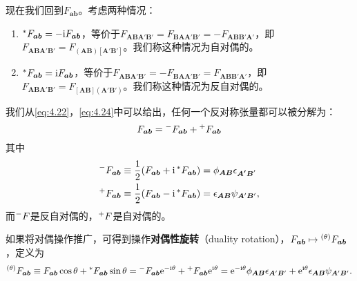 现在我们回到$F_{\boldsymbol{ab}}$。考虑两种情况：
\begin{enumerate}[label=(\alph*)]
	\item $\prescript{*}{}{} F_{\boldsymbol{ab}} =-\mathrm{i} F_{\boldsymbol{ab}}$，等价于$F_{\boldsymbol{ABA} '\boldsymbol{B} '} =F_{\boldsymbol{BAA} '\boldsymbol{B} '} =-F_{\boldsymbol{ABB} '\boldsymbol{A} '}$，即$F_{\boldsymbol{ABA} '\boldsymbol{B} '} =F_{(\boldsymbol{AB})[\boldsymbol{A} '\boldsymbol{B} ']}$。我们称这种情况为自对偶的。
	\item $\prescript{*}{}{} F_{\boldsymbol{ab}} =\mathrm{i} F_{\boldsymbol{ab}}$，等价于$F_{\boldsymbol{ABA} '\boldsymbol{B} '} =-F_{\boldsymbol{BAA} '\boldsymbol{B} '} =F_{\boldsymbol{ABB} '\boldsymbol{A} '}$，即$F_{\boldsymbol{ABA} '\boldsymbol{B} '} =F_{[\boldsymbol{AB}](\boldsymbol{A} '\boldsymbol{B} ')}$。我们称这种情况为反自对偶的。
\end{enumerate}

我们从\ref{eq:4.22}，\ref{eq:4.24}中可以给出，任何一个反对称张量都可以被分解为：
\begin{equation*}
	F_{\boldsymbol{ab}} =\prescript{-}{}{} F_{\boldsymbol{ab}} +\prescript{+}{}{} F_{\boldsymbol{ab}}
\end{equation*}
其中
\begin{equation*}
	\begin{aligned}
		\prescript{-}{}{} F_{\boldsymbol{ab}} & \equiv \frac{1}{2} (F_{\boldsymbol{ab}} +\mathrm{i}\prescript{*}{}{} F_{\boldsymbol{ab}} )=\phi _{\boldsymbol{AB}} \epsilon _{\boldsymbol{A'B} '}\\
		\prescript{+}{}{} F_{\boldsymbol{ab}} & \equiv \frac{1}{2} (F_{\boldsymbol{ab}} -\mathrm{i}\prescript{*}{}{} F_{\boldsymbol{ab}} )=\epsilon _{\boldsymbol{AB}} \psi _{\boldsymbol{A} '\boldsymbol{B} '} ,
	\end{aligned}
\end{equation*}
而$\prescript{-}{}{} F$是反自对偶的，$\prescript{+}{}{} F$是自对偶的。



如果将对偶操作推广，可得到操作\textbf{对偶性旋转}（duality rotation），$F_{\boldsymbol{ab}} \mapsto \prescript{( \theta )}{}{} F_{\boldsymbol{ab}}$，定义为
\begin{equation*}
	\prescript{( \theta )}{}{} F_{\boldsymbol{ab}} \equiv F_{\boldsymbol{ab}}\cos \theta +\prescript{*}{}{} F_{\boldsymbol{ab}}\sin \theta =\prescript{-}{}{} F_{\boldsymbol{ab}}\mathrm{e}^{-\mathrm{i} \theta } +\prescript{+}{}{} F_{\boldsymbol{ab}}\mathrm{e}^{\mathrm{i} \theta } =\mathrm{e}^{-\mathrm{i} \theta } \phi _{\boldsymbol{AB}} \epsilon _{\boldsymbol{A} '\boldsymbol{B} '} +\mathrm{e}^{\mathrm{i} \theta } \epsilon _{\boldsymbol{AB}} \psi _{\boldsymbol{A} '\boldsymbol{B} '} .
\end{equation*}


